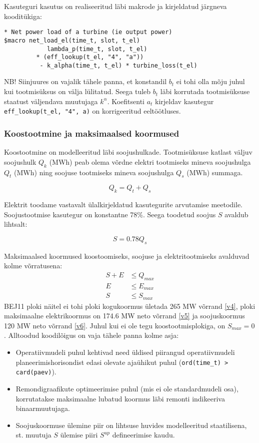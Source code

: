 \documentclass[10pt,a4paper]{article}
\begin{document}
Kasuteguri kasutus on realiseeritud läbi makrode ja kirjeldatud järgneva kooditükiga:
\begin{verbatim}
* Net power load of a turbine (ie output power)
$macro net_load_el(time_t, slot, t_el)                                         
            lambda_p(time_t, slot, t_el)                                       
         * (eff_lookup(t_el, "4", "a"))                                        
          - k_alpha(time_t, t_el) * turbine_loss(t_el)
\end{verbatim}
NB! Siinjuures on vajalik tähele panna, et konstandil $b_t$ ei tohi olla mõju juhul kui tootmisüksus on välja lülitatud. Seega tuleb $b_t$ läbi korrutada tootmisüksuse staatust väljendava muutujaga $k^\alpha$. Koefitsenti $a_t$ kirjeldav kasutegur \texttt{eff\_lookup(t\_el, "4", a)} on korrigeeritud eeltöötluses.
 
\subsubsection{Koostootmine ja maksimaalsed koormused}
Koostootmine on modelleeritud läbi soojushulkade. Tootmisüksuse katlast väljuv soojushulk $Q_k$ (MWh) peab olema võrdne elektri tootmiseks mineva soojushulga $Q_t$ (MWh) ning soojuse tootmiseks mineva soojushulga $Q_s$ (MWh) summaga.

\begin{equation}
Q_k = Q_t + Q_s
\end{equation}

Elektrit toodame vastavalt ülalkirjeldatud kasutegurite arvutamise meetodile. Soojustootmise kasutegur on konstantne 78\%. Seega toodetud soojus $S$ avaldub lihtsalt:

\begin{equation}
S = 0.78 Q_s
\end{equation}

Maksimaalsed koormused koostoomiseks, soojuse ja elektritootmiseks avalduvad kolme võrratusena:
\begin{align}
S + E &\leq Q_{max} \label{v4} \\
E &\leq E_{max} \label{v5} \\
S &\leq S_{max} \label{v6}
\end{align}
BEJ11 ploki näitel ei tohi ploki kogukoormus ületada 265 MW võrrand \eqref{v4}, ploki maksimaalne elektrikoormus on 174.6 MW neto võrrand \eqref{v5} ja soojuskoormus 120 MW neto võrrand \eqref{v6}. Juhul kui ei ole tegu koostootmisplokiga, on $S_{max} = 0$. Alltoodud koodilõigus on vaja tähele panna kolme asja:
\begin{itemize}
\item Operatiivmudeli puhul kehtivad need üldised piirangud operatiivmudeli planeerimishorisondist edasi olevate ajaühikut puhul (\texttt{ord(time\_t) > card(paev)}).
\item Remondigraafikute optimeerimise puhul (mis ei ole standardmudeli osa), korrutatakse maksimaalne lubatud koormus läbi remonti indikeeriva binaarmuutujaga.
\item Soojuskoormuse ülemine piir on lihtsuse huvides modelleeritud staatilisena, st. muutuja $S$ ülemise piiri $S^{up}$ defineerimise kaudu.
\end{itemize}
\end{document}
